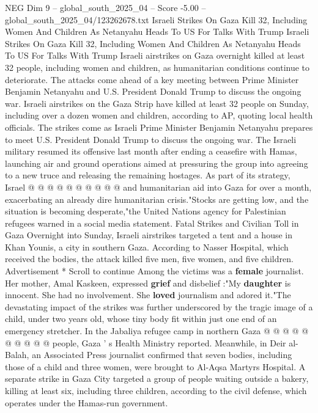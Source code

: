 \begin{textsample}{NEG Dim 9 – global\_south\_2025\_04 – Score -5.00 – global\_south\_2025\_04/123262678.txt}  \label{ex:f9_neg_294}
Israeli Strikes On Gaza Kill 32, Including Women And Children As Netanyahu Heads To US For Talks With Trump Israeli Strikes On Gaza Kill 32, Including Women And Children As Netanyahu Heads To US For Talks With Trump Israeli airstrikes on Gaza overnight killed at least 32 people, including women and children, as humanitarian conditions continue to deteriorate.
The attacks come ahead of a key meeting between Prime Minister Benjamin Netanyahu and U.S.
President Donald Trump to discuss the ongoing war.
Israeli airstrikes on the Gaza Strip have killed at least 32 people on Sunday, including over a dozen women and children, according to AP, quoting local health officials.
The strikes come as Israeli Prime Minister Benjamin Netanyahu prepares to meet U.S.
President Donald Trump to discuss the ongoing war.
The Israeli military resumed its offensive last month after ending a ceasefire with Hamas, launching air and ground operations aimed at pressuring the group into agreeing to a new truce and releasing the remaining hostages.
As part of its strategy, Israel @ @ @ @ @ @ @ @ @ @ and humanitarian aid into Gaza for over a month, exacerbating an already dire humanitarian crisis."Stocks are getting low, and the situation is becoming desperate,"the United Nations agency for Palestinian refugees warned in a social media statement.
Fatal Strikes and Civilian Toll in Gaza Overnight into Sunday, Israeli airstrikes targeted a tent and a house in Khan Younis, a city in southern Gaza.
According to Nasser Hospital, which received the bodies, the attack killed five men, five women, and five children.
Advertisement * Scroll to continue Among the victims was a \textbf{female} journalist.
Her mother, Amal Kaskeen, expressed \textbf{grief} and disbelief :"My \textbf{daughter} is innocent.
She had no involvement.
She \textbf{loved} journalism and adored it."The devastating impact of the strikes was further underscored by the tragic image of a child, under two years old, whose tiny body fit within just one end of an emergency stretcher.
In the Jabaliya refugee camp in northern Gaza @ @ @ @ @ @ @ @ @ @ people, Gaza ' s Health Ministry reported.
Meanwhile, in Deir al-Balah, an Associated Press journalist confirmed that seven bodies, including those of a child and three women, were brought to Al-Aqsa Martyrs Hospital.
A separate strike in Gaza City targeted a group of people waiting outside a bakery, killing at least six, including three children, according to the civil defense, which operates under the Hamas-run government.

\end{textsample}
